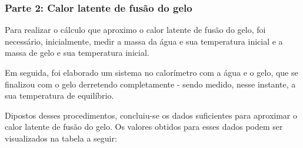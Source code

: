 \documentclass[a4paper]{article}
\begin{document}
			\subsubsection{Parte 2: Calor latente de fusão do gelo}

				Para realizar o cálculo que aproximo o calor latente de fusão do gelo,
				foi necessário, inicialmente, medir a massa da água e sua temperatura
				inicial e a massa de gelo e sua temperatura inicial.

				Em seguida, foi elaborado um sistema no calorímetro com a água e o
				gelo, que se finalizou com o gelo derretendo completamente - sendo
				medido, nesse instante, a sua temperatura de equilíbrio.

				Dipostos desses procedimentos, concluiu-se os dados suficientes para
				aproximar o calor latente de fusão do gelo. Os valores obtidos para
				esses dados podem ser visualizados na tabela a seguir:

				\newpage{}
\end{document}
